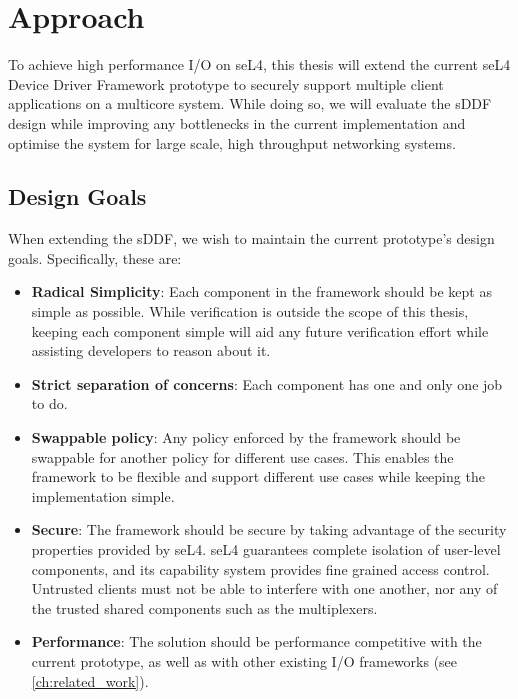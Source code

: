 \chapter{Approach}\label{ch:approach}
To achieve high performance I/O on seL4, this thesis will extend the current seL4 Device Driver Framework prototype 
to securely support multiple client applications on a multicore system. While doing so, 
we will evaluate the sDDF design while improving any bottlenecks in the current implementation
and optimise the system for large scale, high throughput networking systems.

\section{Design Goals}
When extending the sDDF, we wish to maintain the current prototype's design goals. 
Specifically, these are:
\begin{itemize}
\item \textbf{Radical Simplicity}: Each component in the framework should be kept as simple as possible. While verification is outside the scope
of this thesis, keeping each component simple will aid any future verification effort while assisting developers to reason about it.
\item \textbf{Strict separation of concerns}: Each component has one and only one job to do. 
\item \textbf{Swappable policy}: Any policy enforced by the framework should be swappable for another policy for different use cases.
This enables the framework to be flexible and support different use cases while keeping the implementation simple.
\item \textbf{Secure}: The framework should be secure by taking advantage of the security properties provided by seL4. seL4 guarantees
complete isolation of user-level components, and its capability system provides fine grained access control. Untrusted clients must not be able
to interfere with one another, nor any of the trusted shared components such as the multiplexers. 
\item \textbf{Performance}: The solution should be performance competitive with the current prototype,
as well as with other existing I/O frameworks (see \autoref{ch:related_work}).
\end{itemize}


